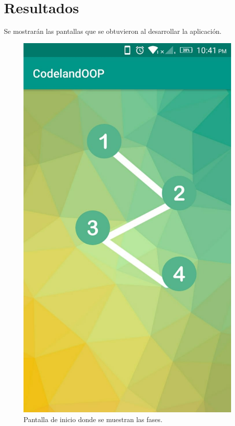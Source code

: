 \chapter{Resultados}

Se mostrarán las pantallas que se obtuvieron al desarrollar la aplicación.

\begin{figure}[H]
	\begin{center}
		\includegraphics[scale=0.3]{img/ss1.jpg} 
		\caption{Pantalla de inicio donde se muestran las fases.}
		\label{fases}
	\end{center}
\end{figure}


